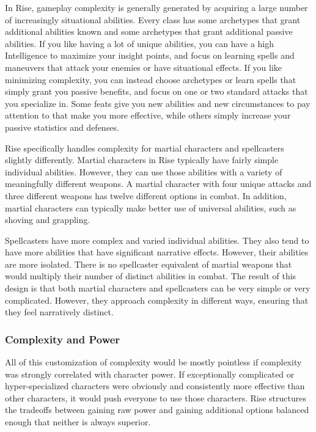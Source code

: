       In Rise, gameplay complexity is generally generated by acquiring a large number of increasingly situational abilities.
      Every class has some archetypes that grant additional abilities known and some archetypes that grant additional passive abilities.
      If you like having a lot of unique abilities, you can have a high Intelligence to maximize your insight points, and focus on learning spells and maneuvers that attack your enemies or have situational effects.
      If you like minimizing complexity, you can instead choose archetypes or learn spells that simply grant you passive benefits, and focus on one or two standard attacks that you specialize in.
      Some feats give you new abilities and new circumstances to pay attention to that make you more effective, while others simply increase your passive statistics and defenses.

      Rise specifically handles complexity for martial characters and spellcasters slightly differently.
      Martial characters in Rise typically have fairly simple individual abilities.
      However, they can use those abilities with a variety of meaningfully different weapons.
      A martial character with four unique attacks and three different weapons has twelve different options in combat.
      In addition, martial characters can typically make better use of universal abilities, such as shoving and grappling.

      Spellcasters have more complex and varied individual abilities.
      They also tend to have more abilities that have significant narrative effects.
      However, their abilities are more isolated.
      There is no spellcaster equivalent of martial weapons that would multiply their number of distinct abilities in combat.
      The result of this design is that both martial characters and spellcasters can be very simple or very complicated.
      However, they approach complexity in different ways, ensuring that they feel narratively distinct.

    \subsubsection{Complexity and Power}
      All of this customization of complexity would be mostly pointless if complexity was strongly correlated with character power.
      If exceptionally complicated or hyper-specialized characters were obviously and consistently more effective than other characters, it would push everyone to use those characters.
      Rise structures the tradeoffs between gaining raw power and gaining additional options balanced enough that neither is always superior.

